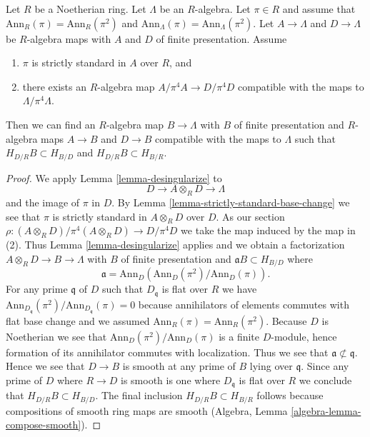 \begin{lemma}
\label{lemma-desingularize-strictly-standard}
Let $R$ be a Noetherian ring. Let $\Lambda$ be an $R$-algebra.
Let $\pi \in R$ and assume that $\text{Ann}_R(\pi) = \text{Ann}_R(\pi^2)$ and
$\text{Ann}_\Lambda(\pi) = \text{Ann}_\Lambda(\pi^2)$.
Let $A \to \Lambda$ and $D \to \Lambda$ be $R$-algebra maps with
$A$ and $D$ of finite presentation. Assume
\begin{enumerate}
\item $\pi$ is strictly standard in $A$ over $R$, and
\item there exists an $R$-algebra map $A/\pi^4 A \to D/\pi^4 D$ compatible
with the maps to $\Lambda/\pi^4 \Lambda$.
\end{enumerate}
Then we can find an $R$-algebra map $B \to \Lambda$ with $B$ of finite
presentation and $R$-algebra maps $A \to B$ and $D \to B$
compatible with the maps to $\Lambda$ such that $H_{D/R}B \subset H_{B/D}$
and $H_{D/R}B \subset H_{B/R}$.
\end{lemma}

\begin{proof}
We apply Lemma \ref{lemma-desingularize} to
$$
D \longrightarrow A \otimes_R D \longrightarrow \Lambda
$$
and the image of $\pi$ in $D$. By
Lemma \ref{lemma-strictly-standard-base-change}
we see that $\pi$ is strictly standard in $A \otimes_R D$ over $D$.
As our section $\rho : (A \otimes_R D)/\pi^4 (A \otimes_R D) \to D/\pi^4 D$
we take the map induced by the map in (2). Thus
Lemma \ref{lemma-desingularize} applies and we obtain a factorization
$A \otimes_R D \to B \to \Lambda$ with $B$ of finite presentation
and $\mathfrak a B \subset H_{B/D}$ where
$$
\mathfrak a = \text{Ann}_D(\text{Ann}_D(\pi^2)/\text{Ann}_D(\pi)).
$$
For any prime $\mathfrak q$ of $D$ such that $D_\mathfrak q$ is flat over $R$
we have
$\text{Ann}_{D_\mathfrak q}(\pi^2)/\text{Ann}_{D_\mathfrak q}(\pi) = 0$
because annihilators of elements commutes with flat base change and
we assumed $\text{Ann}_R(\pi) = \text{Ann}_R(\pi^2)$. Because $D$ is
Noetherian we see that $\text{Ann}_D(\pi^2)/\text{Ann}_D(\pi)$ is a finite
$D$-module, hence formation of its annihilator commutes with localization.
Thus we see that $\mathfrak a \not \subset \mathfrak q$. Hence we see
that $D \to B$ is smooth at any prime of $B$ lying over $\mathfrak q$.
Since any prime of $D$ where $R \to D$ is smooth is one where
$D_\mathfrak q$ is flat over $R$ we conclude that $H_{D/R}B \subset H_{B/D}$.
The final inclusion $H_{D/R}B \subset H_{B/R}$ follows because compositions
of smooth ring maps are smooth
(Algebra, Lemma \ref{algebra-lemma-compose-smooth}).
\end{proof}


